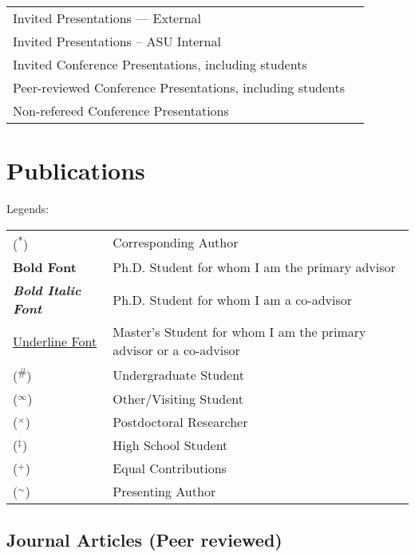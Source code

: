 \documentclass[letterpaper, 12pt]{extarticle}
\begin{document}
\begin{tabular}{p{}p{}}
Invited Presentations --- External    & \\
Invited Presentations -- ASU Internal & \\
Invited Conference Presentations, \newline
including students                    & \\
Peer-reviewed Conference Presentations, \newline
including students                    & \\
Non-refereed Conference Presentations & \\
\end{tabular}

\section{Publications}%
Legends:

\begin{tabular}{p{}p{}}
(\textsuperscript{*})                     & Corresponding Author \\
\textbf{Bold Font}                        & Ph.D. Student for whom I am the primary advisor  \\
\textbf{\textit{Bold Italic Font}}        & Ph.D. Student for whom I am a co-advisor  \\
\underline{Underline Font}                & Master's Student for whom I am the primary advisor
or a co-advisor                          \\
(\textsuperscript{\#})                    & Undergraduate Student \\
($^\infty$)                               & Other/Visiting Student \\
($^\times$)                               & Postdoctoral Researcher \\
($^\ddagger$)                             & High School Student \\
($^+$)                                    & Equal Contributions \\
($^\sim$)                                 & Presenting Author \\
\end{tabular}
\nocite{*}
\subsection{Journal Articles (Peer reviewed)}%
\printbibliography[heading=none, type=article, resetnumbers=true]
\end{document}
